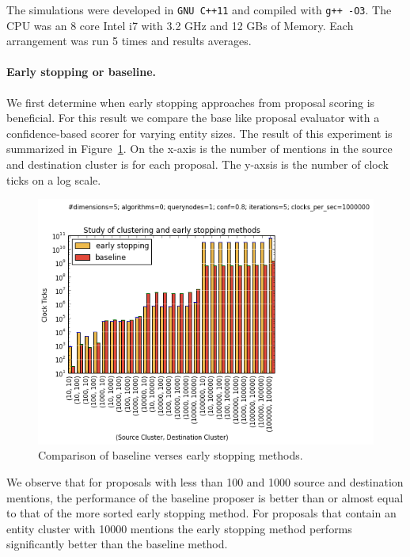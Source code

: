 The simulations were developed in \texttt{GNU C++11} and compiled with \texttt{g++ -O3}. 
The CPU was an 8 core Intel i7 with 3.2 GHz and 12 GBs of Memory.
Each arrangement was run 5 times and results averages.



\paragraph{Early stopping or baseline.}
We first determine when early stopping approaches from proposal scoring is beneficial.
For this result we compare the base like proposal evaluator with a confidence-based scorer for varying entity sizes.
The result of this experiment is summarized in Figure~\ref{fig:clustering-v-early-stopping}.
On the x-axis is the number of mentions in the source and destination cluster is for each proposal. 
The y-axsis is the number of clock ticks on a log scale.

\begin{figure}
\centering
\includegraphics[width=\columnwidth, clip=true,trim=0cm 0cm 4cm 1.2cm]{media/clustering-v-early-stopping.png}
\caption{Comparison of baseline verses early stopping methods.}
\label{fig:clustering-v-early-stopping}
\end{figure}

We observe that for proposals with less than 100 and 1000 source and
destination mentions, the performance of the baseline proposer is better than
or almost equal to that of the more sorted early stopping method.
For proposals that contain an entity cluster with 10000 mentions
the early stopping method performs significantly better than the baseline method.

